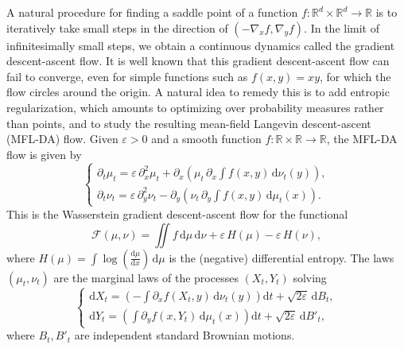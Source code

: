 \documentclass[11pt]{amsart}
\theoremstyle{remark}
\theoremstyle{definition}
\numberwithin{equation}{section}
\numberwithin{proposition}{section}
\newcommand{\ep}{\varepsilon}
\newcommand{\Ll}{\left}
\newcommand{\Rr}{\right}
\renewcommand{\d}{\mathrm{d}}
\newcommand{\dr}{\partial}
\newcommand{\1}{\mathbf{1}}
\newcommand{\mcl}{\mathcal}
\begin{document}
A natural procedure for finding a saddle point of a function $f :  \mathbb{R}^d \times \mathbb{R}^d \to \mathbb{R}$ is to iteratively take small steps in the direction of $(-\nabla_x f, \nabla_y f)$. In the limit of infinitesimally small steps, we obtain a continuous dynamics called the gradient descent-ascent flow. It is well known that this gradient descent-ascent flow can fail to converge, even for simple functions such as $f(x,y) = xy$, for which the flow circles around the origin. A natural idea to remedy this is to add entropic regularization, which amounts to optimizing over probability measures rather than points, and to study the resulting mean-field Langevin descent-ascent (MFL-DA) flow.
%
Given $\varepsilon > 0$ and a smooth function $f : \mathbb{R} \times \mathbb{R} \to \mathbb{R}$, the MFL-DA flow is given by
%
\begin{equation}
    \label{e.MFLDA}
        \begin{cases}
        \displaystyle{\dr_t \mu_t = \ep \, \dr_{x}^2 \mu_t + \dr_x \Ll( \mu_t \, \dr_x \int f(x,y) \, \d \nu_t(y) \Rr) , }
        \\
        \displaystyle{\dr_t \nu_t = \ep \, \dr_{y}^2 \nu_t -\dr_y \Ll( \nu_t \, \dr_y \int f(x,y) \, \d \mu_t(x) \Rr) .}
        \end{cases}
\end{equation}
%       
This is the Wasserstein gradient descent-ascent flow for the functional
%
\begin{equation*}  %
\mcl F(\mu, \nu) = \iint f \, \d \mu \, \d \nu + \ep \, H(\mu) - \ep \, H(\nu),
\end{equation*}
%
where $H(\mu) = \int \log \Ll( \frac{\d \mu}{\d x} \Rr) \, \d \mu$ is the (negative) differential entropy. The laws $(\mu_t, \nu_t)$ are the marginal laws of the processes $(X_t, Y_t)$ solving
%
\begin{equation}
\label{e.SDE.f}
\begin{cases}
\displaystyle{\d X_t = \Ll( -\int \dr_x f(X_t, y) \, \d \nu_t(y) \Rr) \d t + \sqrt{2\ep} \, \d B_t, } \\
\displaystyle{ \d Y_t = \Ll( \int \dr_y f(x, Y_t) \, \d \mu_t(x) \Rr) \d t + \sqrt{2\ep} \, \d B'_t,}
\end{cases}
\end{equation}
%
where $B_t, B'_t$ are independent standard Brownian motions. 
\end{document}

